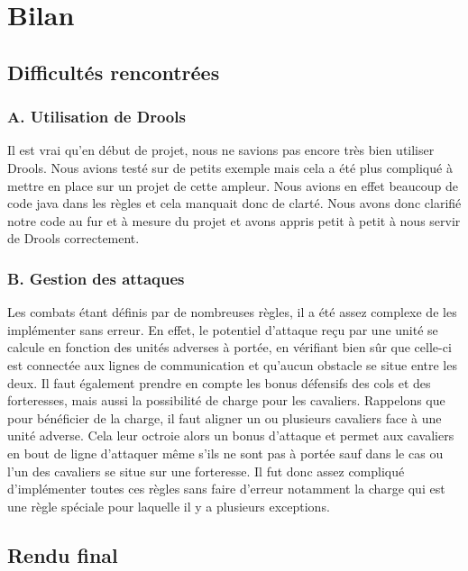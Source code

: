 \chapter{Bilan}

	\section{Difficultés rencontrées}   

		\subsection{A. Utilisation de Drools}
		Il est vrai qu'en début de projet, nous ne savions pas encore très bien utiliser Drools. Nous avions testé sur de petits exemple mais cela a été plus compliqué
		à mettre en place sur un projet de cette ampleur. Nous avions en effet beaucoup de code java dans les règles et cela manquait donc de clarté. Nous avons
		donc clarifié notre code au fur et à mesure du projet et avons appris petit à petit à nous servir de Drools correctement. 
		
		\subsection{B. Gestion des attaques}
		Les combats étant définis par de nombreuses règles, il a été assez complexe de les implémenter sans erreur.
		En effet, le potentiel d'attaque reçu par une unité se calcule en fonction des unités adverses à portée, en vérifiant bien sûr que celle-ci est connectée aux lignes
		de communication et qu'aucun obstacle se situe entre les deux.
		Il faut également prendre en compte les bonus défensifs des cols et des forteresses, mais aussi la possibilité de charge pour les cavaliers.
		Rappelons que pour bénéficier de la charge, il faut aligner un ou plusieurs cavaliers face à une unité adverse.
		Cela leur octroie alors un bonus d'attaque et permet aux cavaliers en bout de ligne d'attaquer même s'ils ne sont pas à portée sauf dans le cas ou l'un des cavaliers
		se situe sur une forteresse.
		Il fut donc assez compliqué d'implémenter toutes ces règles sans faire d'erreur notamment la charge qui est une règle spéciale pour laquelle il y a
		plusieurs exceptions.
		
	\section{Rendu final}
	
